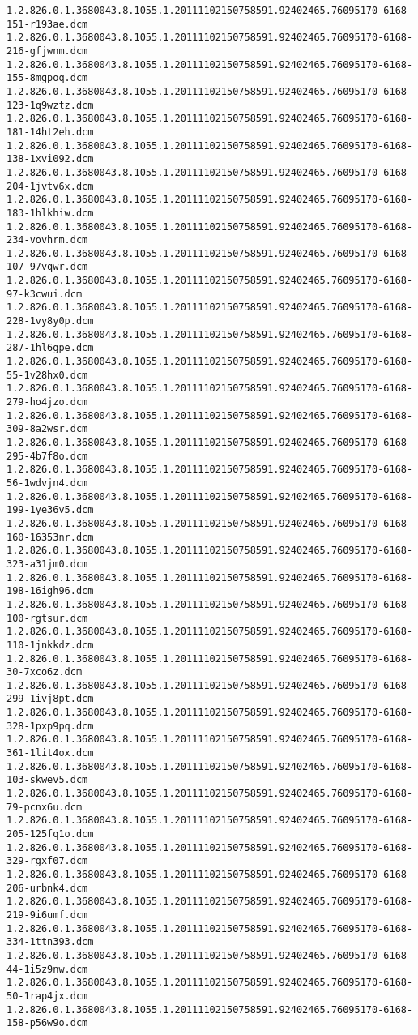 \begin{lstlisting}
1.2.826.0.1.3680043.8.1055.1.20111102150758591.92402465.76095170-6168-151-r193ae.dcm 1.2.826.0.1.3680043.8.1055.1.20111102150758591.92402465.76095170-6168-216-gfjwnm.dcm 1.2.826.0.1.3680043.8.1055.1.20111102150758591.92402465.76095170-6168-155-8mgpoq.dcm 1.2.826.0.1.3680043.8.1055.1.20111102150758591.92402465.76095170-6168-123-1q9wztz.dcm 1.2.826.0.1.3680043.8.1055.1.20111102150758591.92402465.76095170-6168-181-14ht2eh.dcm 1.2.826.0.1.3680043.8.1055.1.20111102150758591.92402465.76095170-6168-138-1xvi092.dcm 1.2.826.0.1.3680043.8.1055.1.20111102150758591.92402465.76095170-6168-204-1jvtv6x.dcm 1.2.826.0.1.3680043.8.1055.1.20111102150758591.92402465.76095170-6168-183-1hlkhiw.dcm 1.2.826.0.1.3680043.8.1055.1.20111102150758591.92402465.76095170-6168-234-vovhrm.dcm 1.2.826.0.1.3680043.8.1055.1.20111102150758591.92402465.76095170-6168-107-97vqwr.dcm 1.2.826.0.1.3680043.8.1055.1.20111102150758591.92402465.76095170-6168-97-k3cwui.dcm 1.2.826.0.1.3680043.8.1055.1.20111102150758591.92402465.76095170-6168-228-1vy8y0p.dcm 1.2.826.0.1.3680043.8.1055.1.20111102150758591.92402465.76095170-6168-287-1hl6gpe.dcm 1.2.826.0.1.3680043.8.1055.1.20111102150758591.92402465.76095170-6168-55-1v28hx0.dcm 1.2.826.0.1.3680043.8.1055.1.20111102150758591.92402465.76095170-6168-279-ho4jzo.dcm 1.2.826.0.1.3680043.8.1055.1.20111102150758591.92402465.76095170-6168-309-8a2wsr.dcm 1.2.826.0.1.3680043.8.1055.1.20111102150758591.92402465.76095170-6168-295-4b7f8o.dcm 1.2.826.0.1.3680043.8.1055.1.20111102150758591.92402465.76095170-6168-56-1wdvjn4.dcm 1.2.826.0.1.3680043.8.1055.1.20111102150758591.92402465.76095170-6168-199-1ye36v5.dcm 1.2.826.0.1.3680043.8.1055.1.20111102150758591.92402465.76095170-6168-160-16353nr.dcm 1.2.826.0.1.3680043.8.1055.1.20111102150758591.92402465.76095170-6168-323-a31jm0.dcm 1.2.826.0.1.3680043.8.1055.1.20111102150758591.92402465.76095170-6168-198-16igh96.dcm 1.2.826.0.1.3680043.8.1055.1.20111102150758591.92402465.76095170-6168-100-rgtsur.dcm 1.2.826.0.1.3680043.8.1055.1.20111102150758591.92402465.76095170-6168-110-1jnkkdz.dcm 1.2.826.0.1.3680043.8.1055.1.20111102150758591.92402465.76095170-6168-30-7xco6z.dcm 1.2.826.0.1.3680043.8.1055.1.20111102150758591.92402465.76095170-6168-299-1ivj8pt.dcm 1.2.826.0.1.3680043.8.1055.1.20111102150758591.92402465.76095170-6168-328-1pxp9pq.dcm 1.2.826.0.1.3680043.8.1055.1.20111102150758591.92402465.76095170-6168-361-1lit4ox.dcm 1.2.826.0.1.3680043.8.1055.1.20111102150758591.92402465.76095170-6168-103-skwev5.dcm 1.2.826.0.1.3680043.8.1055.1.20111102150758591.92402465.76095170-6168-79-pcnx6u.dcm 1.2.826.0.1.3680043.8.1055.1.20111102150758591.92402465.76095170-6168-205-125fq1o.dcm 1.2.826.0.1.3680043.8.1055.1.20111102150758591.92402465.76095170-6168-329-rgxf07.dcm 1.2.826.0.1.3680043.8.1055.1.20111102150758591.92402465.76095170-6168-206-urbnk4.dcm 1.2.826.0.1.3680043.8.1055.1.20111102150758591.92402465.76095170-6168-219-9i6umf.dcm 1.2.826.0.1.3680043.8.1055.1.20111102150758591.92402465.76095170-6168-334-1ttn393.dcm 1.2.826.0.1.3680043.8.1055.1.20111102150758591.92402465.76095170-6168-44-1i5z9nw.dcm 1.2.826.0.1.3680043.8.1055.1.20111102150758591.92402465.76095170-6168-50-1rap4jx.dcm 1.2.826.0.1.3680043.8.1055.1.20111102150758591.92402465.76095170-6168-158-p56w9o.dcm 
\end{lstlisting}
